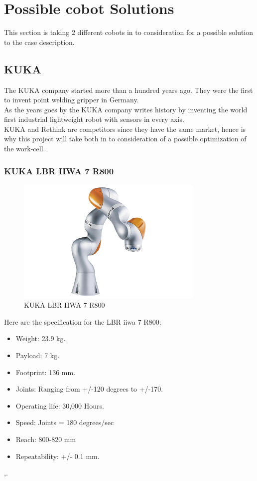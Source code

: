 
\section{Possible cobot Solutions} \label{ch:UR}

This section is taking 2 different cobots in to consideration for a possible solution to the case description.

\subsection{KUKA}

The KUKA company started more than a hundred years ago. They were the first to invent point welding gripper in Germany.\\
As the years goes by the KUKA company writes history by inventing the world first industrial lightweight robot with sensors in every axis.\\

KUKA and Rethink are competitors since they have the same market, hence is why this project will take both in to consideration of a possible optimization of the work-cell\cite{KukaHist}.\\


\subsubsection{KUKA LBR IIWA 7 R800}
\begin{figure}[h]
    \centering
    \includegraphics[width=9cm]{UR/1502895088_1.png}
    \caption{KUKA LBR IIWA 7 R800 \cite{KUKAbillede}}
    \label{fig:LBR IIWA}
\end{figure}

Here are the specification for the LBR iiwa 7 R800:\\

\begin{itemize}
    \item Weight: 23.9 kg.
    \item Payload: 7 kg.
    \item Footprint: 136 mm.
    \item Joints: Ranging from +/-120 degrees to +/-170.
    \item Operating life: 30,000 Hours.
    \item Speed: Joints = 180 degrees/sec
    \item Reach: 800-820 mm
    \item Repeatability: +/- 0.1 mm.
\end{itemize}
\cite{KukaSpec1},\cite{KukaSpec2}.

